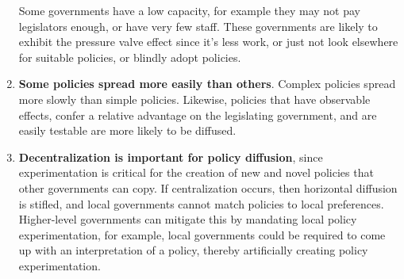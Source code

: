 \begin{enumerate}
    Some governments have a low capacity, for example they may not pay
    legislators enough, or have very few staff. These governments are
    likely to exhibit the pressure valve effect since it's less work,
    or just not look elsewhere for suitable policies, or blindly adopt
    policies.
  \item \textbf{Some policies spread more easily than others}. Complex
    policies spread more slowly than simple policies. Likewise,
    policies that have observable effects, confer a relative advantage
    on the legislating government, and are easily testable are more
    likely to be diffused.
  \item \textbf{Decentralization is important for policy diffusion},
    since experimentation is critical for the creation of new and
    novel policies that other governments can copy. If centralization
    occurs, then horizontal diffusion is stifled, and local
    governments cannot match policies to local
    preferences. Higher-level governments can mitigate this by
    mandating local policy experimentation, for example, local
    governments could be required to come up with an interpretation of
    a policy, thereby artificially creating policy experimentation.
\end{enumerate}






